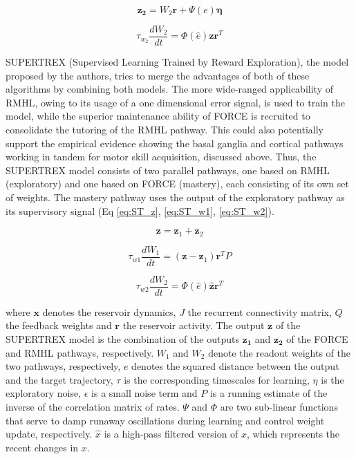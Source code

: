 \begin{equation}
    \mathbf{z_2}=W_2 \mathbf{r}+\Psi(e) \boldsymbol{\eta}
    \label{eq:RMHL_z}
\end{equation}

\begin{equation}
    \tau_{w_2} \frac{d W_2}{d t}=\Phi(\hat{e}) \hat{\mathbf{z}} \mathbf{r}^{T}
    \label{eq:RMHL_dW}
\end{equation}

SUPERTREX (Supervised Learning Trained by Reward Exploration), the model proposed by the authors, tries to merge the advantages of both of these algorithms by combining both models. The more wide-ranged applicability of RMHL, owing to its usage of a one dimensional error signal, is used to train the model, while the superior maintenance ability of FORCE is recruited to consolidate the tutoring of the RMHL pathway. This could also potentially support the empirical evidence showing the basal ganglia and cortical pathways working in tandem for motor skill acquisition, discussed above. Thus, the SUPERTREX model consists of two parallel pathways, one based on RMHL (exploratory) and one based on FORCE (mastery), each consisting of its own set of weights. The mastery pathway uses the output of the exploratory pathway as its supervisory signal (Eq \ref{eq:ST_z}, \ref{eq:ST_w1}, \ref{eq:ST_w2}).


\begin{equation}
    \mathbf{z}=\mathbf{z}_{1}+\mathbf{z}_{2}
    \label{eq:ST_z}
\end{equation}

\begin{equation}
    \tau_{w 1} \frac{d W_{1}}{d t}=\left(\mathbf{z}-\mathbf{z}_{1}\right) \mathbf{r}^{T} P
    \label{eq:ST_w1}
\end{equation}

\begin{equation}
    \tau_{w 2} \frac{d W_{2}}{d t}=\Phi(\hat{e}) \hat{\mathbf{z}} \mathbf{r}^{T}
    \label{eq:ST_w2}
\end{equation}
    
where $\mathbf{x}$ denotes the reservoir dynamics, $J$ the recurrent connectivity matrix, $Q$ the feedback weights and $\mathbf{r}$ the reservoir activity. The output $\mathbf{z}$ of the SUPERTREX model is the combination of the outputs $\mathbf{z_1}$ and $\mathbf{z_2}$ of the FORCE and RMHL pathways, respectively. $W_1$ and $W_2$ denote the readout weights of the two pathways, respectively, $e$ denotes the squared distance between the output and the target trajectory, $\tau$ is the corresponding timescales for learning, $\eta$ is the exploratory noise, $\epsilon$ is a small noise term and $P$ is a running estimate of the inverse of the correlation matrix of rates. $\Psi$ and $\Phi$ are two sub-linear functions that serve to damp runaway oscillations during learning and control weight update, respectively. $\hat{x}$  is a high-pass filtered version of $x$, which represents the recent changes in $x$.



